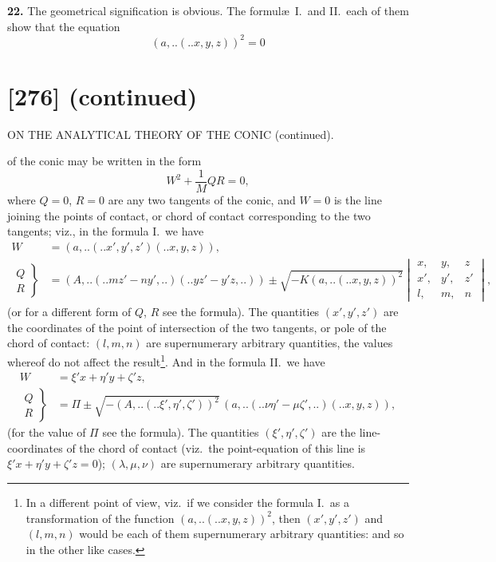 \documentclass[12pt,a4paper]{article}
\newcommand{\qform}[2]{(#1 \mathbin{..} #2)}
\theoremstyle{definition}
\begin{document}
\textbf{22.} The geometrical signification is obvious. The formul\ae\ I.\ and II.\ each of them show that the equation
\[
(a,..\!\qform{}{x, y, z})^{2} = 0
\]

\newpage
\section*{[276] (continued)}
\begin{center}
{\large ON THE ANALYTICAL THEORY OF THE CONIC (continued).}
\end{center}

of the conic may be written in the form
\[
W^{2} + \frac{1}{M}QR = 0,
\]
where $Q = 0$, $R = 0$ are any two tangents of the conic, and $W = 0$ is the line joining the points of contact, or chord of contact corresponding to the two tangents; viz., in the formula I.\ we have
\begin{align*}
W &= (a,..\!\qform{}{x', y', z'}\!\qform{}{x, y, z}),\\
\left.\begin{array}{c} Q \\ R \end{array}\right\}
&= (A,..\!\qform{}{mz' - ny',..}\!\qform{}{yz' - y'z,..})
\pm \sqrt{-K(a,..\!\qform{}{x, y, z})^{2}}
\begin{vmatrix}
x, & y, & z \\
x', & y', & z' \\
l, & m, & n
\end{vmatrix},
\end{align*}
(or for a different form of $Q$, $R$ see the formula). The quantities $(x', y', z')$ are the coordinates of the point of intersection of the two tangents, or pole of the chord of contact: $(l, m, n)$ are supernumerary arbitrary quantities, the values whereof do not affect the result\footnote{In a different point of view, viz.\ if we consider the formula I.\ as a transformation of the function $(a,..\!\qform{}{x, y, z})^{2}$, then $(x', y', z')$ and $(l, m, n)$ would be each of them supernumerary arbitrary quantities: and so in the other like cases.}. And in the formula II.\ we have
\begin{align*}
W &= \xi'x + \eta'y + \zeta'z,\\
\left.\begin{array}{c} Q \\ R \end{array}\right\}
&= \Pi \pm \sqrt{-(A,..\!\qform{}{\xi', \eta', \zeta'})^{2}}\, (a,..\!\qform{}{\nu\eta' - \mu\zeta',..}\!\qform{}{x, y, z}),
\end{align*}
(for the value of $\Pi$ see the formula). The quantities $(\xi', \eta', \zeta')$ are the line-coordinates of the chord of contact (viz.\ the point-equation of this line is $\xi'x + \eta'y + \zeta'z = 0$); $(\lambda, \mu, \nu)$ are supernumerary arbitrary quantities.
\end{document}
